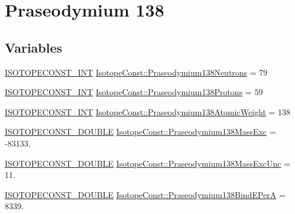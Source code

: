 \hypertarget{group___isotope_const-_praseodymium-_pr138}{}\section{Praseodymium 138}
\label{group___isotope_const-_praseodymium-_pr138}
\subsection*{Variables}
\begin{DoxyCompactItemize}
\item 
\mbox{\hyperlink{group___isotope_const-_macros_ga5f18360b3e99483a35c32d789e62621c}{I\+S\+O\+T\+O\+P\+E\+C\+O\+N\+S\+T\+\_\+\+I\+NT}} \mbox{\hyperlink{group___isotope_const-_praseodymium-_pr138_ga8b9ffe79e1792889d781f4a1c6571940}{Isotope\+Const\+::\+Praseodymium138\+Neutrons}} = 79
\item 
\mbox{\hyperlink{group___isotope_const-_macros_ga5f18360b3e99483a35c32d789e62621c}{I\+S\+O\+T\+O\+P\+E\+C\+O\+N\+S\+T\+\_\+\+I\+NT}} \mbox{\hyperlink{group___isotope_const-_praseodymium-_pr138_gaaf1b3898e9e6549a817f514b3f154623}{Isotope\+Const\+::\+Praseodymium138\+Protons}} = 59
\item 
\mbox{\hyperlink{group___isotope_const-_macros_ga5f18360b3e99483a35c32d789e62621c}{I\+S\+O\+T\+O\+P\+E\+C\+O\+N\+S\+T\+\_\+\+I\+NT}} \mbox{\hyperlink{group___isotope_const-_praseodymium-_pr138_ga2f8aad02fad7630e61d4ecb222195e3f}{Isotope\+Const\+::\+Praseodymium138\+Atomic\+Weight}} = 138
\item 
\mbox{\hyperlink{group___isotope_const-_macros_ga8f45a7272ce02c0b4c65c44636ed719a}{I\+S\+O\+T\+O\+P\+E\+C\+O\+N\+S\+T\+\_\+\+D\+O\+U\+B\+LE}} \mbox{\hyperlink{group___isotope_const-_praseodymium-_pr138_ga414fde83bbfa79c16220b785c8591dc5}{Isotope\+Const\+::\+Praseodymium138\+Mass\+Exc}} = -\/83133.
\item 
\mbox{\hyperlink{group___isotope_const-_macros_ga8f45a7272ce02c0b4c65c44636ed719a}{I\+S\+O\+T\+O\+P\+E\+C\+O\+N\+S\+T\+\_\+\+D\+O\+U\+B\+LE}} \mbox{\hyperlink{group___isotope_const-_praseodymium-_pr138_ga2bfcc0ba1a1fc9f233cbfff511e519c2}{Isotope\+Const\+::\+Praseodymium138\+Mass\+Exc\+Unc}} = 11.
\item 
\mbox{\hyperlink{group___isotope_const-_macros_ga8f45a7272ce02c0b4c65c44636ed719a}{I\+S\+O\+T\+O\+P\+E\+C\+O\+N\+S\+T\+\_\+\+D\+O\+U\+B\+LE}} \mbox{\hyperlink{group___isotope_const-_praseodymium-_pr138_ga427fd9f2e587e1c97ae90cfc7059c3e1}{Isotope\+Const\+::\+Praseodymium138\+Bind\+E\+PerA}} = 8339.

\end{DoxyCompactItemize}
